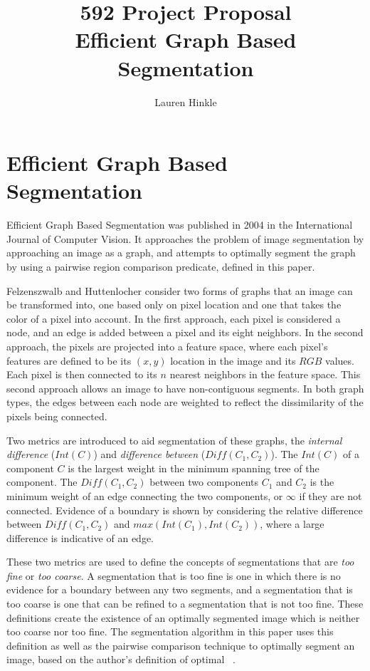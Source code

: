 
\title{592 Project Proposal \\ Efficient Graph Based Segmentation}
\author{Lauren Hinkle}


\maketitle

\section{Efficient Graph Based Segmentation}
Efficient Graph Based Segmentation was published in 2004 in the International
Journal of Computer Vision.  It approaches the problem of image segmentation
by approaching an image as a graph, and attempts to optimally segment the graph
by using a pairwise region comparison predicate, defined in this paper.

Felzenszwalb and Huttenlocher consider two forms of graphs that an image can be
transformed into, one based only on pixel location and one that takes the color
of a pixel into account.  In the first approach, each pixel is considered a
node, and an edge is added between a pixel and its eight neighbors.  In the
second approach, the pixels are projected into a feature space, where each
pixel's features are defined to be its $(x,y)$ location in the image and its $RGB$
values.  Each pixel is then connected to its $n$ nearest neighbors in the feature
space.  This second approach allows an image to have non-contiguous segments.  In
both graph types, the edges between each node are weighted to reflect the
dissimilarity of the pixels being connected.

Two metrics are introduced to aid segmentation of these graphs, the \emph{internal
difference} ($Int(C)$) and \emph{difference between} ($Diff(C_1,C_2)$).  The
$Int(C)$ of a component $C$ is the largest weight in the minimum spanning tree
of the component.  The $Diff(C_1,C_2)$ between two components $C_1$ and $C_2$ is the
minimum weight of an edge connecting the two components, or $\infty$ if they are
not connected.  Evidence of a boundary is shown by considering the relative
difference between $Diff(C_1,C_2)$ and $max(Int(C_1),Int(C_2))$, where a large
difference is indicative of an edge.

These two metrics are used to define the concepts of segmentations that are
\emph{too fine} or \emph{too coarse}.  A segmentation that is too fine is one
in which there is no evidence for a boundary between any two segments, and a
segmentation that is too coarse is one that can be refined to a segmentation
that is not too fine.  These definitions create the existence of an optimally
segmented image which is neither too coarse nor too fine.  The segmentation
algorithm in this paper uses this definition as well as the pairwise comparison
technique to optimally segment an image, based on the author's definition of
optimal ~\cite{felzenszwalb2004}.

